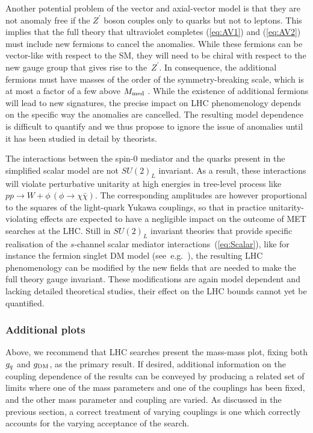 Another potential problem of the  vector and axial-vector model  is that they are not anomaly free if the $Z^\prime$ boson  couples only to quarks but not to leptons. This  implies that the full theory that ultraviolet completes (\ref{eq:AV1}) and  (\ref{eq:AV2}) must include new fermions to cancel the anomalies. While these fermions can be vector-like with respect to the SM, they will need to be chiral with respect to the new gauge group that gives rise to the~$Z^\prime$. In consequence, the  additional fermions  must have masses of the order of the symmetry-breaking scale, which  is at most a factor of a few above $M_{\rm med}$ \cite{Kahlhoefer:2015bea}.  While the existence of additional fermions will lead to new signatures, the precise impact on LHC phenomenology depends on the specific way the anomalies are cancelled. The resulting model dependence is difficult to quantify and we thus propose to ignore the issue of anomalies until it has been studied in detail by theorists. 

The interactions between the spin-0 mediator and the quarks present in the simplified scalar model are not $SU(2)_L$ invariant. As a result, these interactions will violate perturbative unitarity at high energies in tree-level process like $pp \to W + \phi \, (\phi \to \chi \bar \chi)$. The corresponding amplitudes are however proportional to the squares of the light-quark Yukawa couplings, so that in practice unitarity-violating effects are expected to have a negligible impact on the outcome of MET searches at the LHC. Still in $SU(2)_L$ invariant theories that provide specific realisation of the $s$-channel scalar mediator interactions~(\ref{eq:Scalar}),  like for instance the fermion singlet DM model (see~e.g.~\cite{Abdallah:2015ter}), the resulting LHC phenomenology can be modified by the new fields that are needed to make the full theory gauge invariant. These modifications are again model dependent and lacking detailed theoretical studies, their effect on the  LHC bounds cannot yet be quantified. 


\subsubsection{Additional plots}
\label{additionalplot}

Above, we recommend that LHC searches present the mass-mass plot, fixing both $g_q$ and $g_{\rm{DM}}$, as the primary result. If desired, additional information on the coupling dependence of the results can be conveyed by producing a related set of limits where one of the mass parameters and one of the couplings has been fixed, and the other mass parameter and coupling are varied. As discussed in the previous section, a correct treatment of varying couplings is one which correctly accounts for the varying acceptance of the search.


